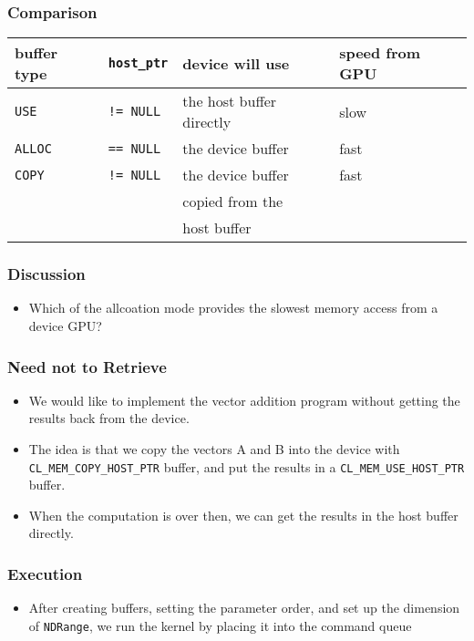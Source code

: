 \documentclass{beamer}
\begin{document}
\begin{frame}
  \frametitle{Comparison}
  \begin{tabular}{|l|l|l|l|} \hline
    buffer type & {\tt host\_ptr} & device will use & speed from GPU \\ \hline
    {\tt USE} & {\tt != NULL} & the host buffer directly & slow \\ \hline
    {\tt ALLOC} & {\tt == NULL} & the device buffer & fast \\ \hline
    {\tt COPY} & {\tt != NULL} & the device buffer & fast \\
    & & copied from the &  \\ 
    & & host buffer & \\ \hline
  \end{tabular}
\end{frame}

\begin{frame}
  \frametitle{Discussion}
  \begin{itemize}
    \item Which of the allcoation mode provides the slowest memory
      access from a device GPU?
  \end{itemize}
\end{frame}

\begin{frame}
  \frametitle{Need not to Retrieve}
  \begin{itemize}
    \item We would like to implement the vector addition program
      without getting the results back from the device.
    \item The idea is that we copy the vectors A and B into the device with
      {\tt CL\_MEM\_COPY\_HOST\_PTR} buffer, and put the results in a
      {\tt CL\_MEM\_USE\_HOST\_PTR} buffer.
    \item When the computation is over then, we can get the results in
      the host buffer directly.
  \end{itemize}
\end{frame}

\begin{frame}
\end{frame}

\begin{frame}
  \frametitle{Execution}
  \begin{itemize}
    \item After creating buffers, setting the parameter order, and
      set up the dimension of {\tt NDRange}, we run the kernel by
      placing it into the command queue
  \end{itemize}
\end{frame}
\end{document}
